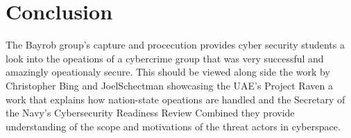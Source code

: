 \documentclass[fleqn,12pt]{SelfArx} %
\begin{document}
\section*{Conclusion} %
The Bayrob group's capture\cite{Symantech:Blog:Bayrob} and procecution \cite{Gaughan:Court:Nicolescu} provides cyber security students a look into the opeations of a cybercrime group that was very successful and amazingly opeationaly secure.  This should be viewed along side the work by Christopher Bing and JoelSchectman  showcasing the UAE's Project Raven\cite{Bing:Reuters:UAERaven} a work that explains how nation-state opeations are handled and the Secretary of the Navy's Cybersecurity Readiness Review \cite{Navy:ReadRev} Combined they provide understanding of the scope and motivations of the threat actors in cyberspace. 
\end{document}

